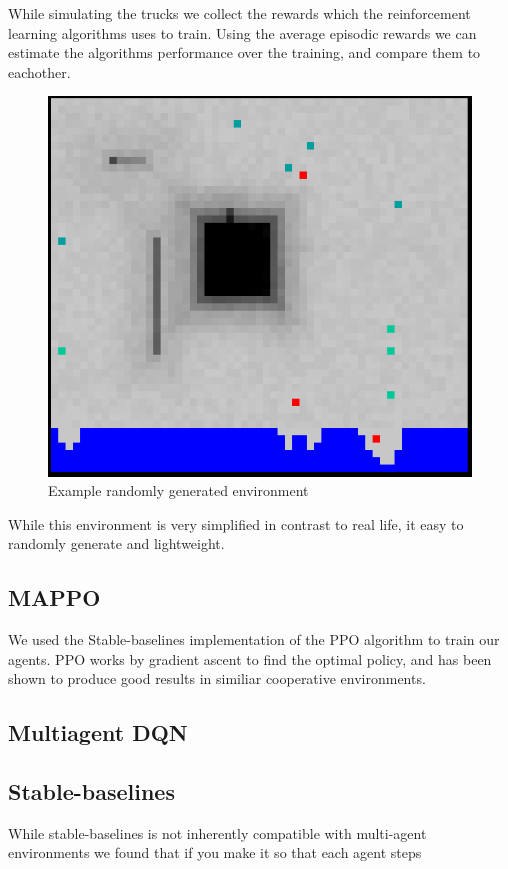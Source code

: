 \documentclass[conference]{IEEEtran}
\begin{document}
	While simulating the trucks we collect the rewards which the reinforcement learning algorithms uses to train.
	Using the average episodic rewards we can estimate the algorithms performance over the training, and compare them to eachother.
	\begin{figure}
		\includegraphics[width=0.9\columnwidth]{graphs/example_env.png}
		\caption{Example randomly generated environment}
	\end{figure}
	While this environment is very simplified in contrast to real life, it easy to randomly generate and lightweight.

	\subsection{MAPPO}
	We used the Stable-baselines implementation of the PPO algorithm to train our agents.
	PPO works by gradient ascent to find the optimal policy, and has been shown to produce good results in similiar cooperative environments. %


	\subsection{Multiagent DQN}

	\subsection{Stable-baselines}
	While stable-baselines is not inherently compatible with multi-agent environments we found that if you
	make it so that each agent steps
\end{document}
